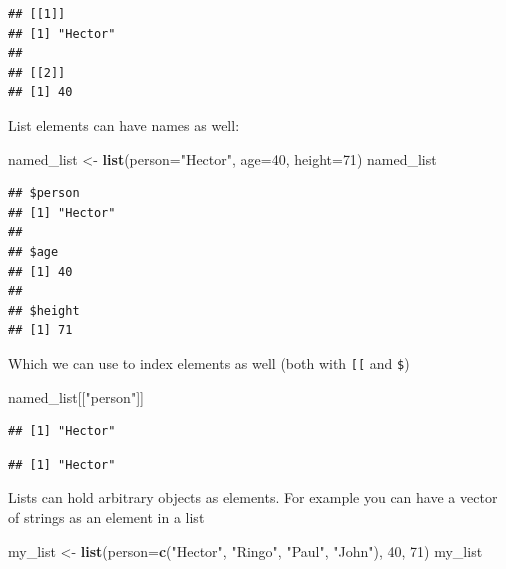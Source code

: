 \documentclass[]{book}
\newenvironment{Shaded}{\begin{snugshade}}{\end{snugshade}}
\newcommand{\KeywordTok}[1]{\textcolor[rgb]{0.13,0.29,0.53}{\textbf{#1}}}
\newcommand{\DataTypeTok}[1]{\textcolor[rgb]{0.13,0.29,0.53}{#1}}
\newcommand{\DecValTok}[1]{\textcolor[rgb]{0.00,0.00,0.81}{#1}}
\newcommand{\StringTok}[1]{\textcolor[rgb]{0.31,0.60,0.02}{#1}}
\newcommand{\OperatorTok}[1]{\textcolor[rgb]{0.81,0.36,0.00}{\textbf{#1}}}
\newcommand{\NormalTok}[1]{#1}
\theoremstyle{definition}
\theoremstyle{definition}
\theoremstyle{remark}
\begin{document}
\begin{verbatim}
## [[1]]
## [1] "Hector"
## 
## [[2]]
## [1] 40
\end{verbatim}

List elements can have names as well:

\begin{Shaded}
\begin{Highlighting}[]
\NormalTok{named_list <-}\StringTok{ }\KeywordTok{list}\NormalTok{(}\DataTypeTok{person=}\StringTok{"Hector"}\NormalTok{, }\DataTypeTok{age=}\DecValTok{40}\NormalTok{, }\DataTypeTok{height=}\DecValTok{71}\NormalTok{)}
\NormalTok{named_list}
\end{Highlighting}
\end{Shaded}

\begin{verbatim}
## $person
## [1] "Hector"
## 
## $age
## [1] 40
## 
## $height
## [1] 71
\end{verbatim}

Which we can use to index elements as well (both with \texttt{{[}{[}}
and \texttt{\$})

\begin{Shaded}
\begin{Highlighting}[]
\NormalTok{named_list[[}\StringTok{"person"}\NormalTok{]]}
\end{Highlighting}
\end{Shaded}

\begin{verbatim}
## [1] "Hector"
\end{verbatim}

\begin{Shaded}
\end{Shaded}

\begin{verbatim}
## [1] "Hector"
\end{verbatim}

Lists can hold arbitrary objects as elements. For example you can have a
vector of strings as an element in a list

\begin{Shaded}
\begin{Highlighting}[]
\NormalTok{my_list <-}\StringTok{ }\KeywordTok{list}\NormalTok{(}\DataTypeTok{person=}\KeywordTok{c}\NormalTok{(}\StringTok{"Hector"}\NormalTok{, }\StringTok{"Ringo"}\NormalTok{, }\StringTok{"Paul"}\NormalTok{, }\StringTok{"John"}\NormalTok{), }\DecValTok{40}\NormalTok{, }\DecValTok{71}\NormalTok{)}
\NormalTok{my_list}
\end{Highlighting}
\end{Shaded}
\end{document}
